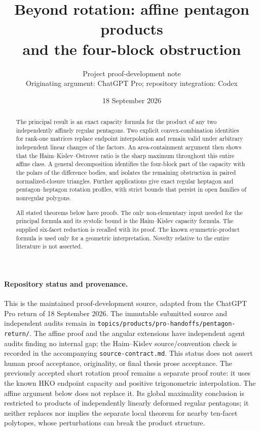\documentclass[11pt,a4paper]{article}
\title{Beyond rotation: affine pentagon products\\and the four-block obstruction}
\author{Project proof-development note\\Originating argument: ChatGPT Pro; repository integration: Codex}
\date{18 September 2026}
\theoremstyle{definition}\newtheorem{definition}[theorem]{Definition}
\theoremstyle{remark}\newtheorem{remark}[theorem]{Remark}
\begin{document}
\maketitle
\begin{abstract}
The principal result is an exact capacity formula for the product of any two independently affinely regular pentagons. Two explicit convex-combination identities for rank-one matrices replace endpoint interpolation and remain valid under arbitrary independent linear changes of the factors. An area-containment argument then shows that the Haim--Kislev--Ostrover ratio is the sharp maximum throughout this entire affine class. A general decomposition identifies the four-block part of the capacity with the polars of the difference bodies, and isolates the remaining obstruction in paired normalized-closure triangles. Further applications give exact regular heptagon and pentagon--heptagon rotation profiles, with strict bounds that persist in open families of nonregular polygons.

All stated theorems below have proofs. The only non-elementary input needed for the principal formula and its systolic bound is the Haim--Kislev capacity formula. The supplied six-facet reduction is recalled with its proof. The known symmetric-product formula is used only for a geometric interpretation. Novelty relative to the entire literature is not asserted.
\end{abstract}
\paragraph{Repository status and provenance.}
This is the maintained proof-development source, adapted from the ChatGPT Pro
return of 18 September 2026. The immutable submitted source and independent
audits remain in \texttt{topics/products/pro-handoffs/pentagon-return/}.
The affine proof and the angular extensions have independent agent audits
finding no internal gap; the Haim--Kislev source/convention check is recorded
in the accompanying \texttt{source-contract.md}. This status does not assert
human proof acceptance, originality, or final thesis prose acceptance.
The previously accepted short rotation proof remains a separate proof route:
it uses the known HKO endpoint capacity and positive trigonometric interpolation.
The affine argument below does not replace it. Its global maximality conclusion
is restricted to products of independently linearly deformed regular pentagons;
it neither replaces nor implies the separate local theorem for nearby ten-facet
polytopes, whose perturbations can break the product structure.
\end{document}
